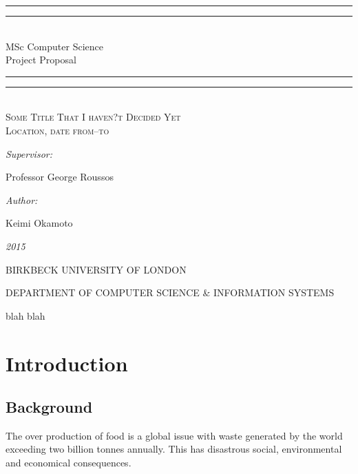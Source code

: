\documentclass[a4paper, 11pt]{article}
\newlength{\drop}
\begin{document}
  \begin{titlepage}
    \textheight
    \centering
    \vspace*{\baselineskip}
    \rule{\textwidth}{1.6pt}\vspace*{-\baselineskip}\vspace*{2pt}
    \rule{\textwidth}{0.4pt}\\[\baselineskip]
    {\Large{MSc Computer Science\\[0.3\baselineskip] }}
    {\huge{Project Proposal\\[0.3\baselineskip] }}
	
    \rule{\textwidth}{0.4pt}\vspace*{-\baselineskip}\vspace{3.2pt}
    \rule{\textwidth}{1.6pt}
    \\[\baselineskip]
    \scshape
    {\Large Some Title That I haven?t Decided Yet \\}
    Location, date from--to\par
    \vspace*{2\baselineskip}
    {\normalsize\emph{Supervisor: }{\large Professor George Roussos\par}}
    {\normalsize\emph{Author: }{\large Keimi Okamoto\par}}
    
    {\itshape 2015}
    \vfill
    {\large BIRKBECK UNIVERSITY OF LONDON\par}
{\footnotesize DEPARTMENT OF COMPUTER SCIENCE \& INFORMATION SYSTEMS}\par
  \end{titlepage}
  
\tableofcontents
\clearpage

blah blah
\clearpage

\section{Introduction}

\subsection{Background}
The over production of food is a global issue with waste generated by the world exceeding two billion tonnes annually. This has disastrous social, environmental and economical consequences. 
\end{document}
